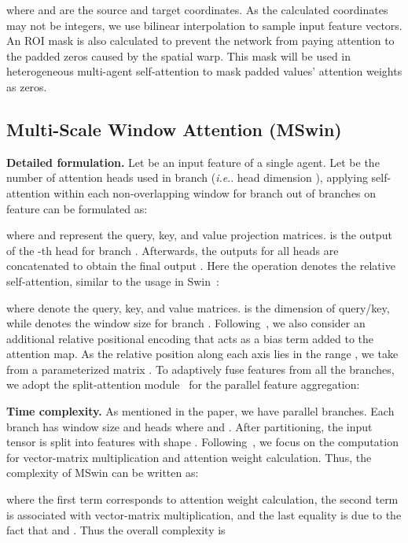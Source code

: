\documentclass[runningheads]{llncs}
\makeatletter
\DeclareRobustCommand\onedot{\futurelet\@let@token\@onedot}
\def\@onedot{\ifx\@let@token.\else.\null\fi\xspace}
\def\ie{\emph{i.e}\onedot} \def\Ie{\emph{I.e}\onedot}
\makeatother
\begin{document}
where  and  are the source and target coordinates. As the calculated coordinates may not be integers, we use bilinear interpolation to sample input feature vectors. An ROI mask is also calculated to prevent the network from paying attention to the padded zeros caused by the spatial warp. This mask will be used in heterogeneous multi-agent self-attention to mask padded values' attention weights as zeros. 

\subsection{Multi-Scale Window Attention (MSwin)}
\label{sec:mswin}
\noindent\textbf{Detailed formulation.}
Let  be an input feature of a single agent. Let  be the number of attention heads used in branch  (\ie head dimension ), applying self-attention within each non-overlapping window  for branch  out of  branches on feature  can be formulated as:

where  and  represent the query, key, and value projection matrices.  is the output of the -th head for branch . Afterwards, the outputs for all heads  are concatenated to obtain the final output . Here the  operation denotes the relative self-attention, similar to the usage in Swin~\cite{liu2021swin}:
\vspace{-2mm}

where  denote the query, key, and value matrices.  is the dimension of query/key, while  denotes the window size for branch .
Following~\cite{liu2021swin,hu2019local}, we also consider an additional relative positional encoding  that acts as a bias term added to the attention map. As the relative position along each axis lies in the range ,  we take  from a parameterized matrix .
To adaptively fuse features from all the  branches, we adopt the split-attention module~\cite{zhang2020resnest} for the parallel feature aggregation:


\noindent\textbf{Time complexity. }As mentioned in the paper, we have  parallel branches. Each branch has  window size and  heads where  and . After partitioning, the input tensor  is split into  features with shape . Following~\cite{liu2021swin}, we focus on the computation for vector-matrix multiplication and attention weight calculation. Thus, the complexity of MSwin can be written as:

where the first term corresponds to attention weight calculation, the second term is associated with vector-matrix multiplication, and the last equality is due to the fact that  and . Thus the overall complexity is 
\end{document}
